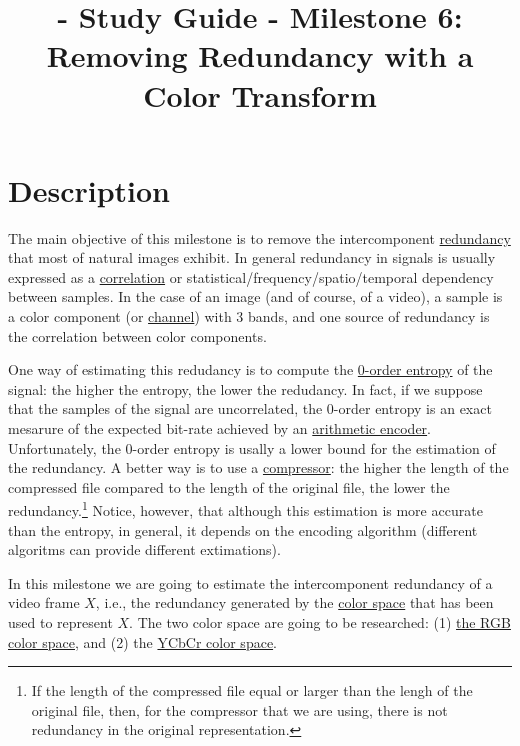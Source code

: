 
\title{\SM{} - Study Guide - Milestone 6: Removing Redundancy with a Color Transform}

\maketitle

\section{Description}

The main objective of this milestone is to remove the intercomponent
\href{https://en.wikipedia.org/wiki/Data_redundancy}{redundancy} that
most of natural images exhibit. In general redundancy in signals is
usually expressed as a
\href{https://en.wikipedia.org/wiki/Correlation_and_dependence}{correlation}
or statistical/frequency/spatio/temporal dependency between
samples. In the case of an image (and of course, of a video), a sample
is a color component (or
\href{https://en.wikipedia.org/wiki/Color_image}{channel}) with 3
bands, and one source of redundancy is the correlation between color
components.

One way of estimating this redudancy is to compute the
\href{https://en.wikipedia.org/wiki/Entropy_(information_theory)}{0-order
  entropy} of the signal: the higher the entropy, the lower the
redudancy. In fact, if we suppose that the samples of the signal are
uncorrelated, the 0-order entropy is an exact mesarure of the expected
bit-rate achieved by an
\href{https://en.wikipedia.org/wiki/Arithmetic_coding}{arithmetic
  encoder}. Unfortunately, the 0-order entropy is usally a lower bound
for the estimation of the redundancy. A better way is to use a
\href{https://en.wikipedia.org/wiki/Data_compression}{compressor}: the
higher the length of the compressed file compared to the length of the
original file, the lower the redundancy.\footnote{If the length of the
  compressed file equal or larger than the lengh of the original file,
  then, for the compressor that we are using, there is not redundancy
  in the original representation.} Notice, however, that although this
estimation is more accurate than the entropy, in general, it depends
on the encoding algorithm (different algoritms can provide different
extimations).

In this milestone we are going to estimate the intercomponent
redundancy of a video frame $X$, i.e., the redundancy generated by the
\href{https://en.wikipedia.org/wiki/Color_space}{color space} that has
been used to represent $X$. The two color space are going to be
researched: (1)
\href{https://en.wikipedia.org/wiki/RGB_color_model}{the RGB color
  space}, and (2) the \href{https://en.wikipedia.org/wiki/YCbCr}{YCbCr
  color space}.

